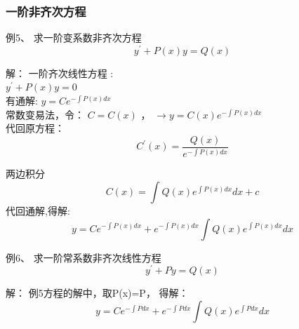 \begin{frame}
	\frametitle{一阶非齐次方程}
	\begin{exampleblock} {例5、	求一阶变系数非齐次方程}
	\begin{equation*}
		y^{\prime}+P(x) y=Q(x)
	\end{equation*}
	\end{exampleblock} 
	\alert{解：} 一阶齐次线性方程 :\\
		$ y^{\prime}+P(x) y=0$  \\ 
		有通解:	{\large 	$y=Ce^{-\int P(x)dx}$}\\	\vspace{0.3cm}
		常数变易法，令： $C=C(x)$ ，	{\large 	$ \to y=C(x)e^{-\int P(x)dx}$} \\ 
		代回原方程：
		\begin{equation*}
			C^{\prime}(x)=\frac {Q(x)} {e^{-\int P(x)dx}}
		\end{equation*}	
\end{frame}

\begin{frame}	
		两边积分
		\begin{equation*}
			C(x)=\int Q(x)e^{\int P(x)dx} dx+c 
		\end{equation*}	
		代回通解,得解:
		\begin{equation*}
			y=Ce^{-\int P(x)dx}+e^{-\int P(x)dx}\int Q(x)e^{\int P(x)dx} dx
		\end{equation*}	
\end{frame}

\begin{frame}
	\begin{exampleblock} {例6、	求一阶常系数非齐次线性方程}
	\begin{equation*}
		y^{\prime}+Py=Q(x)
	\end{equation*}
	\end{exampleblock} 
	\alert{解：} 例5方程的解中，取P(x)=P， 得解：
	\begin{equation*}
		y=Ce^{-\int Pdx}+e^{-\int Pdx}\int Q(x)e^{\int Pdx} dx
	\end{equation*}	
\end{frame}

